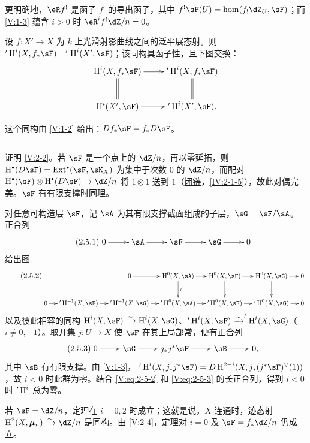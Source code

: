 更明确地，$\eR f^!$ 是函子 $f^!$ 的导出函子，其中 $f^!\sF(U)=\hom(f_!\dZ_U,\sF)$；而 \ref{V:1-3} 蕴含 $i>0$ 时 $\eR^if^!\dZ/n=0$。

\begin{corollary_}\label{V:2-4}
设 $f:X'\to X$ 为 $k$ 上光滑射影曲线之间的泛平展态射。则 $'\h^i(X,f_*\sF)='\h^i(X',\sF)$；该同构具函子性，且下图交换：
\[\xymatrix{\h^i(X,f_*\sF)\ar[r]\ar@{=}[d]&'\h^i(X,f_*\sF)\ar@{=}[d]\\
\h^i(X',\sF)\ar[r]&'\h^i(X',\sF).}\]
\end{corollary_}
这个同构由 \ref{V:1-2} 给出：$Df_*\sF=f_*D\sF$。

\subsection{}\label{V:2-5}
证明 \ref{V:2-2}。若 $\sF$ 是一个点上的 $\dZ/n$，再以零延拓，则 $\h^\bullet(D\sF)=\ext^\bullet(\sF,\sK_X)$ 为集中于次数 $0$ 的 $\dZ/n$，而配对 $\h^\bullet(\sF)\otimes\h^\bullet(D\sF)\to\dZ/n$ 将 $1\otimes1$ 送到 $1$（\hyperref[IV]{闭链}，\ref{IV:2-1-5}），故此对偶完美。$\sF$ 有有限支撑时同理。

对任意可构造层 $\sF$，记 $\sA$ 为其有限支撑截面组成的子层，$\sG=\sF/\sA$。正合列
\begin{equation*}\tag{2.5.1}\label{V:eq:2-5-1}
\xymatrix{0\ar[r]&\sA\ar[r]&\sF\ar[r]&\sG\ar[r]&0}
\end{equation*}
给出图
\begin{equation*}\tag{2.5.2}\label{V:eq:2-5-2}
\resizebox{\linewidth}{!}{$\xymatrix@C=12pt{
&&0\ar[r]&\h^0(X,\sA)\ar[r]\ar[d]^-\wr&\h^0(X,\sF)\ar[r]\ar[d]&\h^0(X,\sG)\ar[r]\ar[d]&0\\
0\ar[r]&'\h^{-1}(X,\sF)\ar[r]&'\h^{-1}(X,\sG)\ar[r]&'\h^0(X,\sA)\ar[r]&'\h^0(X,\sF)\ar[r]&'\h^0(X,\sG)\ar[r]&0
}$}
\end{equation*}
以及彼此相容的同构 $\h^i(X,\sF)\iso\h^i(X,\sG)$、$'\h^i(X,\sF)\iso'\h^i(X,\sG)$（$i\ne0,-1$）。取开集 $j:U\to X$ 使 $\sF$ 在其上局部常，便有正合列
\begin{equation*}\tag{2.5.3}\label{V:eq:2-5-3}
\xymatrix{0\ar[r]&\sG\ar[r]&j_*j^*\sF\ar[r]&\sB\ar[r]&0,}
\end{equation*}
其中 $\sB$ 有有限支撑。由 \ref{V:1-3}，
$'\h^i(X,j_*j^*\sF)=D\h^{2-i}(X,j_*(j^*\sF)^\vee(1))$，故 $i<0$ 时此群为零。结合 \eqref{V:eq:2-5-2} 和 \eqref{V:eq:2-5-3} 的长正合列，得到 $i<0$ 时 $'\operatorname{H}^i$ 总为零。

若 $\sF=\dZ/n$，定理在 $i=0,2$ 时成立；这就是说，$X$ 连通时，迹态射 $\h^2(X,\dmu_n)\iso\dZ/n$ 是同构。由 \ref{V:2-4}，定理对 $i=0$ 及 $\sF=f_*\dZ/n$ 仍成立。

